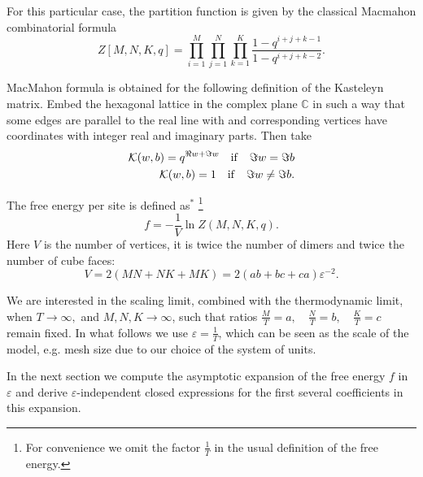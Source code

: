 \documentclass{article}
\begin{document}
For this particular case, the partition function is given by the classical Macmahon combinatorial
formula~\cite{vuletic2009generalization}
\begin{equation}
  \label{eq:12}
   Z[M,N,K,q]=\prod_{i=1}^{M}\prod_{j=1}^{N}\prod_{k=1}^{K}\frac{1-q^{i+j+k-1}}{1-q^{i+j+k-2}}.
\end{equation}


MacMahon formula is obtained for the following definition of the Kasteleyn matrix. Embed the
hexagonal lattice in the complex plane $\mathbb{C}$ in such a way that some edges are parallel to
the real line with and corresponding vertices have coordinates with integer real and imaginary
parts. Then take
\begin{eqnarray}
  \label{eq:18}
  {\cal K}(w,b)=q^{\Re w+\Im w} \quad \mathrm{if}\quad \Im w=\Im b\\
  {\cal K}(w,b)=1 \quad \mathrm{if}\quad \Im w\neq\Im b.
\end{eqnarray}


The   free energy per site is defined as$^{*}$
\footnote{For convenience we omit the factor $\frac{1}{T}$ in the usual definition of the free energy.}
\begin{equation*}
  \label{eq:17}
  f=-\frac{1}{V}\ln Z(M,N,K,q).
\end{equation*}
Here $V$ is the number of vertices, it is twice the number of dimers and twice the number of  cube faces:
\begin{equation}
  \label{eq:19}
  V=2(MN+NK+MK)=2(ab+bc+ca) \varepsilon^{-2}.
\end{equation}

We are interested in the scaling limit, combined with the thermodynamic limit, when $ T\to \infty,$
and $M,N,K\to \infty$, such that ratios $\frac{M}{T}=a,\quad \frac{N}{T}=b, \quad \frac{K}{T}=c$
remain fixed. In what follows we use $\varepsilon=\frac{1}{T}$, which can be seen as the scale of
the model, e.g. mesh size due to our choice of the system of units.

In the next section we compute the asymptotic expansion of the free energy $f$ in $\varepsilon$ and
derive $\varepsilon$-independent closed expressions for the first several coefficients in this
expansion.
  
\end{document}
